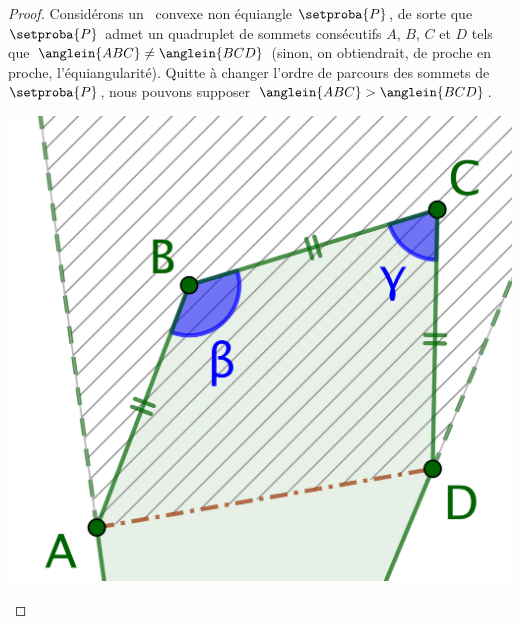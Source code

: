 \begin{proof}
	Considérons un \nequi\ convexe non équiangle $\setproba{P}$, 
	de sorte que $\setproba{P}$ admet un quadruplet de sommets consécutifs $A$, $B$, $C$ et $D$ tels que $\anglein{ABC} \neq \anglein{BCD}$
	(sinon, on obtiendrait, de proche en proche, l'équiangularité).
	Quitte à changer l'ordre de parcours des sommets de $\setproba{P}$, nous pouvons supposer $\anglein{ABC} > \anglein{BCD}$.
	\begin{center}
		\includegraphics[scale=.4]{content/polygon/sol-must-be/2-eq-angles-start.png}
	\end{center}
	

\end{proof}
